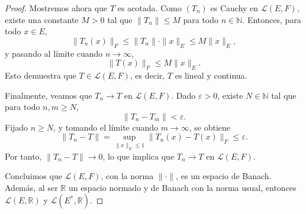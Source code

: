 \begin{proof}
Mostremos ahora que \( T \) es acotada. Como \( (T_n) \) es Cauchy en \( \mathcal{L}(E, F) \), existe una constante \( M > 0 \) tal que \( \|T_n\| \leq M \) para todo \( n \in \mathbb{N} \). Entonces, para todo \( x \in E \),
\[
\|T_n(x)\|_F \leq \|T_n\| \cdot \|x\|_E \leq M \|x\|_E,
\]
y pasando al límite cuando \( n \to \infty \),
\[
\|T(x)\|_F \leq M \|x\|_E.
\]
Esto demuestra que \( T \in \mathcal{L}(E, F) \), es decir, \( T \) es lineal y continua.

Finalmente, veamos que \( T_n \to T \) en \( \mathcal{L}(E, F) \). Dado \( \varepsilon > 0 \), existe \( N \in \mathbb{N} \) tal que para todo \( n, m \geq N \),
\[
\|T_n - T_m\| < \varepsilon.
\]
Fijado \( n \geq N \), y tomando el límite cuando \( m \to \infty \), se obtiene
\[
\|T_n - T\| = \sup_{\|x\|_E \leq 1} \|T_n(x) - T(x)\|_F \leq \varepsilon.
\]
Por tanto, \( \|T_n - T\| \to 0 \), lo que implica que \( T_n \to T \) en \( \mathcal{L}(E, F) \).

\medskip

Concluimos que \( \mathcal{L}(E, F) \), con la norma \( \|\cdot\| \), es un espacio de Banach. Además, al ser $\mathbb{R}$ un espacio normado y de Banach con la norma usual, entonces \( \mathcal{L}(E, \mathbb{R}) \) y \( \mathcal{L}(E^{*}, \mathbb{R}) \).
\end{proof}
\newpage